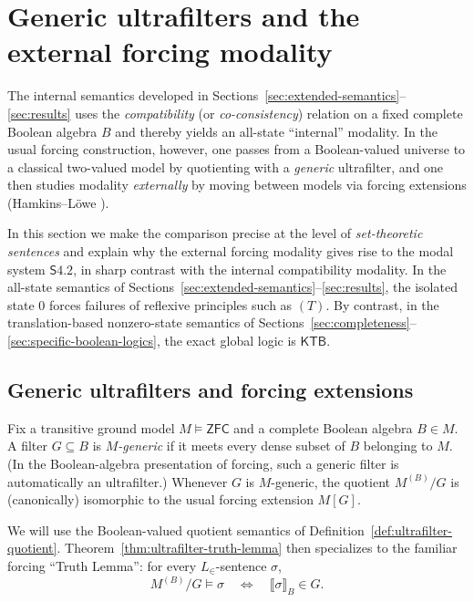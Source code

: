 \documentclass[11pt]{amsart}
\theoremstyle{definition}
\theoremstyle{plain}
\newcommand{\val}[1]{\llbracket #1\rrbracket_B}
\newcommand{\KTB}{\mathsf{KTB}}
\begin{document}
\section{Generic ultrafilters and the external forcing modality}\label{sec:generic-forcing}

The internal semantics developed in Sections~\ref{sec:extended-semantics}--\ref{sec:results} uses the
\emph{compatibility} (or \emph{co-consistency}) relation on a fixed complete Boolean algebra $B$ and
thereby yields an all-state ``internal'' modality. In the usual forcing construction, however,
one passes from a Boolean-valued universe to a classical two-valued model by quotienting
with a \emph{generic} ultrafilter, and one then studies modality \emph{externally} by moving between
models via forcing extensions (Hamkins--L\"owe \cite{HamkinsLowe}).

In this section we make the comparison precise at the level of \emph{set-theoretic sentences} and
explain why the external forcing modality gives rise to the modal system $\mathsf{S4.2}$, in sharp
contrast with the internal compatibility modality. In the all-state semantics of Sections~\ref{sec:extended-semantics}--\ref{sec:results},
the isolated state $0$ forces failures of reflexive principles such as $(T)$. By contrast, in the
translation-based nonzero-state semantics of Sections~\ref{sec:completeness}--\ref{sec:specific-boolean-logics},
the exact global logic is $\KTB$.

\subsection{Generic ultrafilters and forcing extensions}\label{subsec:generic-ultrafilters}

Fix a transitive ground model $M\models\mathsf{ZFC}$ and a complete Boolean algebra $B\in M$.
A filter $G\subseteq B$ is \emph{$M$-generic} if it meets every dense subset of $B$ belonging to $M$.
(In the Boolean-algebra presentation of forcing, such a generic filter is automatically an ultrafilter.)
Whenever $G$ is $M$-generic, the quotient $M^{(B)}/G$ is (canonically) isomorphic to the usual forcing
extension $M[G]$.

We will use the Boolean-valued quotient semantics of Definition~\ref{def:ultrafilter-quotient}.
Theorem~\ref{thm:ultrafilter-truth-lemma} then specializes to the familiar forcing ``Truth Lemma'':
for every $L_{\in}$-sentence $\sigma$,
\[
M^{(B)}/G \models \sigma
\quad\Longleftrightarrow\quad
\val{\sigma}\in G.
\]
\end{document}
